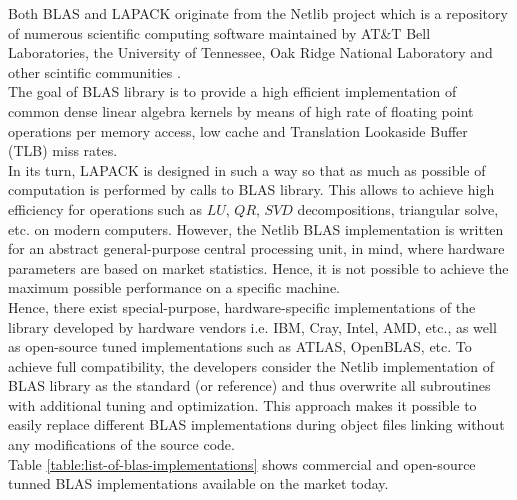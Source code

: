 Both BLAS and LAPACK originate from the Netlib project which is a repository of numerous scientific computing software maintained by AT\&T Bell Laboratories, the University of Tennessee, Oak Ridge National Laboratory and other scintific communities \cite{netlib-overview}.\\


The goal of BLAS library is to provide a high efficient implementation of common dense linear algebra kernels by means of high rate of floating point operations per memory access, low cache and Translation Lookaside Buffer (TLB) miss rates.\\


In its turn, LAPACK is designed in such a way so that as much as possible of computation is performed by calls to BLAS library. This allows to achieve high efficiency for operations such as $LU$, $QR$, $SVD$ decompositions, triangular solve, etc. on modern computers. However, the Netlib BLAS implementation is written for an abstract general-purpose central processing unit, in mind, where hardware parameters are based on market statistics. Hence, it is not possible to achieve the maximum possible performance on a specific machine.\\


Hence, there exist special-purpose, hardware-specific implementations of the library developed by hardware vendors i.e. IBM, Cray, Intel, AMD, etc., as well as open-source tuned implementations such as ATLAS, OpenBLAS, etc. To achieve full compatibility, the developers consider the Netlib implementation of BLAS library as the standard (or reference) and thus overwrite all subroutines with additional tuning and optimization. This approach makes it possible to easily replace different BLAS implementations during object files linking  without any modifications of the source code.\\
 

Table \ref{table:list-of-blas-implementations} shows commercial and open-source tunned BLAS implementations available on the market today.\\

